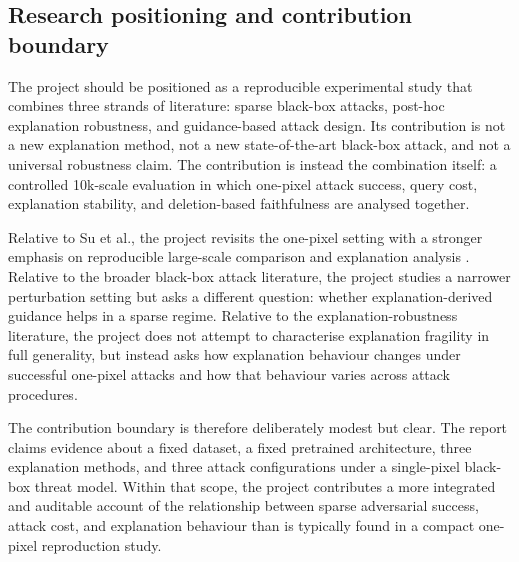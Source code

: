 \subsection{Research positioning and contribution boundary}
The project should be positioned as a reproducible experimental study that combines three strands of literature: sparse black-box attacks, post-hoc explanation robustness, and guidance-based attack design.
Its contribution is not a new explanation method, not a new state-of-the-art black-box attack, and not a universal robustness claim.
The contribution is instead the combination itself: a controlled 10k-scale evaluation in which one-pixel attack success, query cost, explanation stability, and deletion-based faithfulness are analysed together.

Relative to Su et al., the project revisits the one-pixel setting with a stronger emphasis on reproducible large-scale comparison and explanation analysis \cite{su2019onepixel}.
Relative to the broader black-box attack literature, the project studies a narrower perturbation setting but asks a different question: whether explanation-derived guidance helps in a sparse regime.
Relative to the explanation-robustness literature, the project does not attempt to characterise explanation fragility in full generality, but instead asks how explanation behaviour changes under successful one-pixel attacks and how that behaviour varies across attack procedures.

The contribution boundary is therefore deliberately modest but clear.
The report claims evidence about a fixed dataset, a fixed pretrained architecture, three explanation methods, and three attack configurations under a single-pixel black-box threat model.
Within that scope, the project contributes a more integrated and auditable account of the relationship between sparse adversarial success, attack cost, and explanation behaviour than is typically found in a compact one-pixel reproduction study.
